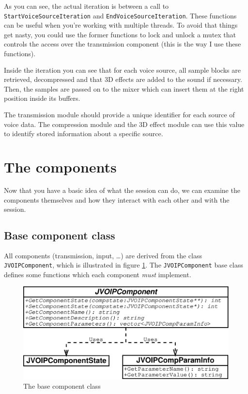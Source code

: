 		As you can see, the actual iteration is between a call to {\tt Start\-Voice\-Source\-Iteration}
		and {\tt End\-Voice\-Source\-Iteration}. These functions can be useful
		when you're working with multiple threads. To avoid that things get nasty,
		you could use the former functions to lock and unlock a mutex that
		controls the access over the transmission component (this is the way I use
		these functions).
		
		Inside the iteration you can see that for each voice source, all sample blocks
		are retrieved, decompressed and that 3D effects are added to the sound if
		necessary. Then, the samples are passed on to the mixer which can insert them
		at the right position inside its buffers.
		
		The transmission module should provide a unique identifier for each source of
		voice data. The compression module and the 3D effect module can use this
		value to identify stored information about a specific source.
		
	\section{The components}
	
	Now that you have a basic idea of what the session can do, we can examine
	the components themselves and how they interact with each other and with the
	session.
	
		\subsection{Base component class}
		
		All components (transmission, input, \ldots) are derived from the class
		{\tt JVOIP\-Com\-po\-nent}, which is illustrated in figure \ref{base-component-class}.
		The {\tt JVOIP\-Com\-po\-nent} base class defines some functions which each
		component {\em must} implement.
		\begin{figure}
			\center
			\includegraphics[width=0.85\linewidth]{images/manual/chapter2/base-component-class.eps}
			\caption{The base component class}
			\label{base-component-class}
		\end{figure}
		
